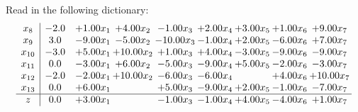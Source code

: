 \documentclass[9pt]{article}
\begin{document}
Read in the following dictionary:
\[\begin{array}{c| c c@{\hskip 2pt} c@{\hskip 2pt} c@{\hskip 2pt} c@{\hskip 2pt} c@{\hskip 2pt} c@{\hskip 2pt} c@{\hskip 2pt} }
 x_{8}   &  -2.0 & +  1.00 x_{1} & +  4.00 x_{2} & -1.00 x_{3} & +  2.00 x_{4} & +  3.00 x_{5} & +  1.00 x_{6} & +  9.00 x_{7}\\
 x_{9}   &  3.0 & -9.00 x_{1} & -5.00 x_{2} & -10.00 x_{3} & -1.00 x_{4} & +  2.00 x_{5} & -6.00 x_{6} & +  7.00 x_{7}\\
 x_{10}   &  -3.0 & +  5.00 x_{1} & + 10.00 x_{2} & +  1.00 x_{3} & +  4.00 x_{4} & -3.00 x_{5} & -9.00 x_{6} & -9.00 x_{7}\\
 x_{11}   &  0.0 & -3.00 x_{1} & +  6.00 x_{2} & -5.00 x_{3} & -9.00 x_{4} & +  5.00 x_{5} & -2.00 x_{6} & -3.00 x_{7}\\
 x_{12}   &  -2.0 & -2.00 x_{1} & + 10.00 x_{2} & -6.00 x_{3} & -6.00 x_{4} &   & +  4.00 x_{6} & + 10.00 x_{7}\\
 x_{13}   &  0.0 & +  6.00 x_{1} &   & +  5.00 x_{3} & -9.00 x_{4} & +  2.00 x_{5} & -1.00 x_{6} & -7.00 x_{7}\\
\hline
z    &  0.0 & +  3.00 x_{1} &   & -1.00 x_{3} & -1.00 x_{4} & +  4.00 x_{5} & -4.00 x_{6} & +  1.00 x_{7}\\
\end{array}\]
\end{document}
